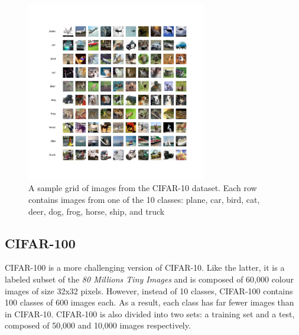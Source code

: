 \begin{figure}[ht!]
  \centering
  \includegraphics[width=0.7\textwidth]{chapter_dlo/assets/cifar-10_example.png}
  \caption{ A sample grid of images from the CIFAR-10 dataset. Each row
    contains images from one of the 10 classes: plane, car, bird, cat,
    deer, dog, frog, horse, ship, and truck}
  \label{fig:intro:cifar10_examples}
\end{figure}


\subsection{CIFAR-100}

CIFAR-100 \cite{CIFARdataset} is a more challenging
version of CIFAR-10. Like the latter, it is a labeled subset of the \emph{80
  Millions Tiny Images} and  is composed of 60,000 colour images of size 32x32
pixels. However, instead of 10 classes, CIFAR-100 contains 100 classes of 600
images each. As a result, each class has far fewer images than in CIFAR-10.
CIFAR-100 is also divided into two sets: a training set and a test, composed of
50,000 and 10,000 images respectively.\\

